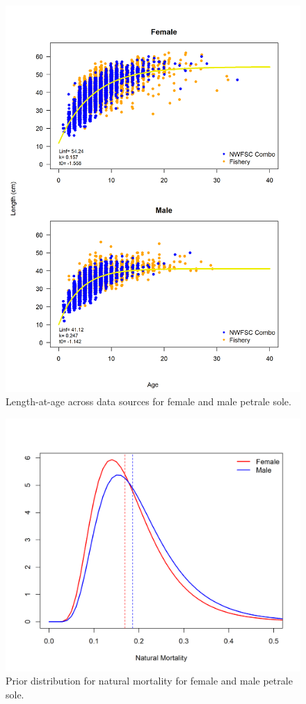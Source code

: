 \documentclass[12pt,]{article}
\begin{document}
\FloatBarrier

\begin{figure}
\centering
\includegraphics{Figures/LengthAgeAll.png}
\caption{Length-at-age across data sources for female and male petrale
sole. \label{fig:length_age}}
\end{figure}

\FloatBarrier

\begin{figure}
\centering
\includegraphics{Figures/M_prior.png}
\caption{Prior distribution for natural mortality for female and male
petrale sole. \label{fig:m_prior}}
\end{figure}
\end{document}
